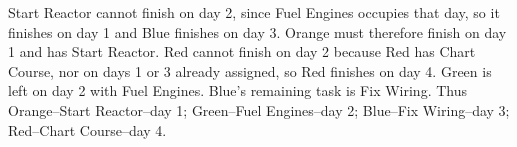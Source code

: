 Start Reactor cannot finish on day 2, since Fuel Engines occupies that day, so it finishes on day 1 and Blue finishes on day 3. Orange must therefore finish on day 1 and has Start Reactor. Red cannot finish on day 2 because Red has Chart Course, nor on days 1 or 3 already assigned, so Red finishes on day 4. Green is left on day 2 with Fuel Engines. Blue's remaining task is Fix Wiring. Thus Orange--Start Reactor--day 1; Green--Fuel Engines--day 2; Blue--Fix Wiring--day 3; Red--Chart Course--day 4.
